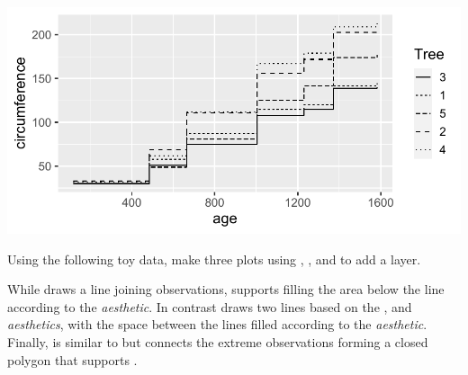\documentclass[krantz2]{krantz}\usepackage{knitr}
\begin{document}
\begin{knitrout}\footnotesize
{}\color{fgcolor}\begin{kframe}
\begin{alltt}
\hlstd{(} 
       \hlstd{(}      \hlopt{+}
  \hlstd{()}
\end{alltt}
\end{kframe}

{\centering \includegraphics[width=.7\textwidth]{figure/pos-step-plot-01-1} 

}


\end{knitrout}

\begin{playground}
Using the following toy data, make three plots using , , and  to add a layer.

\begin{knitrout}\footnotesize
{}\color{fgcolor}\begin{kframe}
\begin{alltt}
 \hlkwb{<-} \hlstd{(} \hlstd{=} \hlstd{(}\hlstd{,}\hlstd{,}\hlstd{,}\hlstd{),}  \hlstd{=} \hlstd{(}\hlstd{,}\hlstd{,}\hlstd{,}\hlstd{))}
\end{alltt}
\end{kframe}
\end{knitrout}
\end{playground}

While  draws a line joining observations,  supports filling the area below the line according to the  \emph{aesthetic}. In contrast  draws two lines based on the ,  and  \emph{aesthetics}, with the space between the lines filled according to the  \emph{aesthetic}. Finally,  is similar to  but connects the extreme observations forming a closed polygon that supports .
\end{document}

